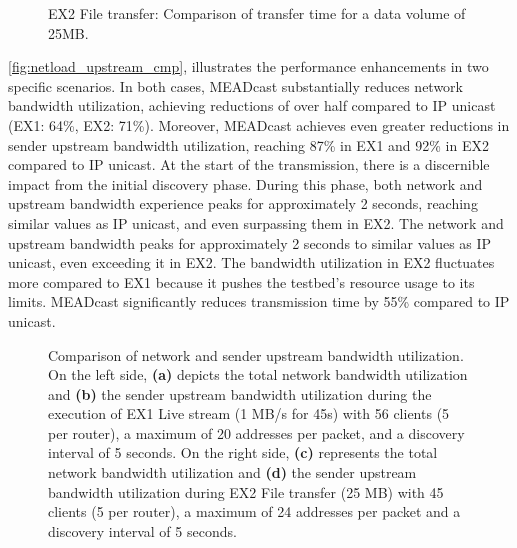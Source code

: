 \begin{figure}
    \begin{center}
        
    \end{center}
    \caption[EX2 File transfer: Comparison of transfer time]{
        EX2 File transfer: Comparison of transfer time for a data volume of 25MB.
    }
    \label{fig:trans_time}
\end{figure}


\autoref{fig:netload_upstream_cmp}, illustrates the performance enhancements in
    two specific scenarios.
In both cases, MEADcast substantially reduces network bandwidth utilization,
    achieving reductions of over half compared to IP unicast (EX1: 64\%, EX2:
    71\%).
Moreover, MEADcast achieves even greater reductions in sender upstream
    bandwidth utilization, reaching 87\% in EX1 and 92\% in EX2 compared to IP
    unicast.
At the start of the transmission, there is a discernible impact from the
    initial discovery phase.
During this phase, both network and upstream bandwidth experience peaks for
    approximately 2 seconds, reaching similar values as IP unicast, and even
    surpassing them in EX2.
The network and upstream bandwidth peaks for approximately 2 seconds to similar
    values as IP unicast, even exceeding it in EX2.
The bandwidth utilization in EX2 fluctuates more compared to EX1 because it
    pushes the testbed's resource usage to its limits.
MEADcast significantly reduces transmission time by 55\% compared to IP unicast.

\begin{figure}
    \begin{center}
        
    \end{center}
    \label{fig:netload_upstream_cmp}
    \caption[Comparison of network and sender upstream bandwidth utilization]{
        Comparison of network and sender upstream bandwidth utilization.
        On the left side, \textbf{(a)} depicts the total network bandwidth
        utilization and \textbf{(b)} the sender upstream bandwidth utilization
        during the execution of EX1 Live stream (1 MB/s for 45s) with 56 clients
        (5 per router), a maximum of 20 addresses per packet, and a discovery
        interval of 5 seconds.
        On the right side, \textbf{(c)} represents the total network bandwidth
        utilization and \textbf{(d)} the sender upstream bandwidth utilization
        during EX2 File transfer (25 MB) with 45 clients (5 per router), a
        maximum of 24 addresses per packet and a discovery interval of 5
        seconds.
    }
\end{figure}



